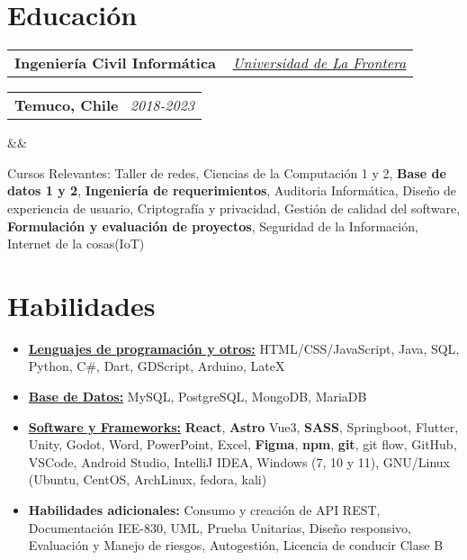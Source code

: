 \documentclass[11pt,a4paper,sans]{moderncv}
\makeatletter
\newcommand{\sectionMargin}{-3mm}
\newcommand*{\customcventry}[7][.13em]{
    \begin{tabular}{@{}l}
    {\bfseries #4} \
    {\itshape #3}
    \end{tabular}
    \hfill
    \begin{tabular}{l@{}}
    {\bfseries #5} \
    {\itshape #2}
    \end{tabular}
    \ifx&#7&%
    \else{\
    \begin{minipage}{\maincolumnwidth}%
    \small#7%
    \end{minipage}}\fi%
    \par\addvspace{#1}
}
\makeatother
\begin{document}
\section{Educación}{
    \customcventry
        {2018-2023}
        { \href{https://1drv.ms/b/c/13c8ae619d64655e/EV5lZJ1hrsgggBOHLAAAAAABHh9OZUbWLd2nx7PTa_OSsg?e=Fedmge}
        {\underline{Universidad de La Frontera}} }
        {Ingeniería Civil Informática}
        {Temuco, Chile}{}{}
        {Cursos Relevantes: 
            {Taller de redes}, 
            {Ciencias de la Computación} 1 y 2, 
            \textbf{Base de datos 1 y 2}, 
            \textbf{Ingeniería de requerimientos},
            {Auditoria Informática}, 
            {Diseño de experiencia de usuario}, 
            {Criptografía y privacidad}, 
            Gestión de {calidad del software}, 
            \textbf{Formulación y evaluación de proyectos},
            {Seguridad de la Información},
            Internet de la cosas{(IoT)}
    }
}

\vspace*{\sectionMargin}
\section{Habilidades}{
    \begin{itemize}[label=\textbullet, itemsep=0mm]
        \item {\underline{\textbf{Lenguajes de programación y otros:}}
            {HTML/CSS/JavaScript},
            {Java},
            {SQL},
            {Python},
            {C\#},
            {Dart},
            {GDScript},
            {Arduino},
            {LateX}
        }
        \item {\underline{\textbf{Base de Datos:}}
            {MySQL},
            {PostgreSQL},
            {MongoDB},
            {MariaDB}
        }
        \item {\underline{\textbf{Software y Frameworks:}}
            \textbf{React},
            \textbf{Astro}
            {Vue3},
            \textbf{SASS},
            {Springboot},
            {Flutter},
            {Unity},
            {Godot},
            {Word},
            {PowerPoint},
            {Excel}, 
            \textbf{Figma},
            \textbf{npm},
            \textbf{git},
            {git flow},
            {GitHub},
            {VSCode},
            {Android Studio},
            {IntelliJ IDEA},
            {Windows} (7, 10 y 11),
            {GNU/Linux} (Ubuntu, CentOS, ArchLinux, fedora, kali)
        }
        \item {\textbf{Habilidades adicionales:} 
            Consumo y creación de {API REST},
            {Documentación IEE-830},
            {UML},
            {Prueba Unitarias},
            {Diseño responsivo},
            Evaluación y {Manejo de riesgos},  
            {Autogestión}, 
            Licencia de conducir {Clase B}
        }
    \end{itemize}
}
\end{document}
